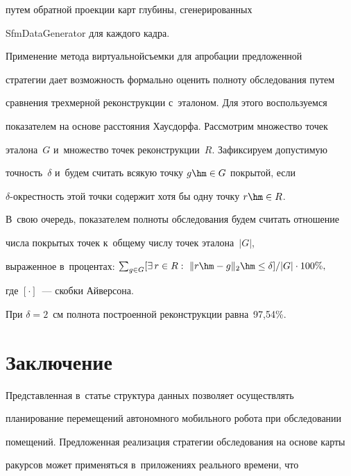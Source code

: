 \noindent

 путем обратной проекции карт глубины, сгенерированных 

SfmDataGenerator для каждого кадра.

  

  Применение метода виртуальной\linebreak съемки для апробации предложенной 

стратегии дает возможность формально оценить полноту обследования путем 

сравнения трехмерной реконструк\-ции с~эталоном. Для этого воспользуемся 

показателем на основе расстояния Хаусдорфа. Рассмотрим множество точек 

эталона~$G$ и~множество точек реконструкции~$R$. Зафиксируем допустимую 

точность~$\delta$ и~будем считать всякую точку $g\hm\in G$ покрытой, если  

$\delta$-окрест\-ность этой точки содержит хотя бы одну точку $r\hm\in R$. 

В~свою очередь, показателем полноты обследования будем считать отношение 

числа покрытых точек к~общему числу точек эталона~$\vert G\vert$, 

выраженное в~процентах: ${\sum\nolimits_{g\in G} [\exists\,r\in R:\ \| r\hm-g\|_2\hm\leq \delta ]}/{\vert 

G\vert}\cdot 100\%,$

            где $[\cdot]$~--- скобки Айверсона.



При $\delta=2$~см полнота построенной реконструкции равна~97,54\%. 







  \section{Заключение}

  

  Представленная в~статье структура данных позволяет осуществлять 

планирование перемещений автономного мобильного робота при обследовании 

помещений. Предложенная реализация стратегии обследования на основе карты 

ракурсов может применяться в~приложениях реального времени, что 

